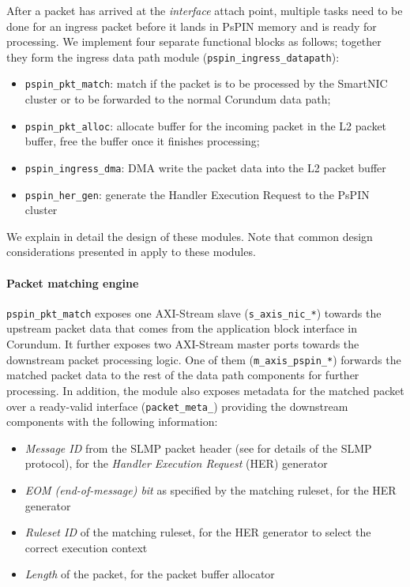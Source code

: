 After a packet has arrived at the \emph{interface} attach point, multiple tasks need to be done for an ingress packet before it lands in PsPIN memory and is ready for processing.  We implement four separate functional blocks as follows; together they form the ingress data path module (\texttt{pspin\_\-ingress\_\-datapath}):

\begin{itemize}
    \item \texttt{pspin\_\-pkt\_\-match}: match if the packet is to be processed by the SmartNIC cluster or to be forwarded to the normal Corundum data path;
    \item \texttt{pspin\_\-pkt\_\-alloc}: allocate buffer for the incoming packet in the L2 packet buffer, free the buffer once it finishes processing;
    \item \texttt{pspin\_\-ingress\_\-dma}: DMA write the packet data into the L2 packet buffer
    \item \texttt{pspin\_\-her\_\-gen}: generate the Handler Execution Request to the PsPIN cluster
\end{itemize}

We explain in detail the design of these modules.  Note that common design considerations presented in  apply to these modules.

\paragraph{Packet matching engine} \texttt{pspin\_\-pkt\_\-match} exposes one AXI-Stream slave (\texttt{s\_\-axis\_\-nic\_\-*}) towards the upstream packet data that comes from the application block interface in Corundum.  It further exposes two AXI-Stream master ports towards the downstream packet processing logic.  One of them (\texttt{m\_\-axis\_\-pspin\_\-*}) forwards the matched packet data to the rest of the data path components for further processing.  In addition, the module also exposes metadata for the matched packet over a ready-valid interface (\texttt{packet\_\-meta\_\-}) providing the downstream components with the following information:

\begin{itemize}
    \item \emph{Message ID} from the SLMP packet header (see  for details of the SLMP protocol), for the \emph{Handler Execution Request} (HER) generator
    \item \emph{EOM (end-of-message) bit} as specified by the matching ruleset, for the HER generator
    \item \emph{Ruleset ID} of the matching ruleset, for the HER generator to select the correct execution context
    \item \emph{Length} of the packet, for the packet buffer allocator
\end{itemize}

